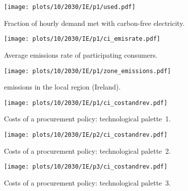 \begin{figure*}
    \centering
    \begin{subfigure}{0.5\textwidth}
        \centering
        \caption{Fraction of hourly demand met with carbon-free electricity.}
        \texttt{[image: plots/10/2030/IE/p1/used.pdf]}
        \label{fig:10-2030-IE-p1-used}
    \end{subfigure}%
    \begin{subfigure}{0.5\textwidth}
        \centering
        \caption{Average emissions rate of participating consumers.}
        \texttt{[image: plots/10/2030/IE/p1/ci\_emisrate.pdf]}
        \label{fig:10-2030-IE-p1-ci_emisrate}
    \end{subfigure}

    \begin{subfigure}{0.5\textwidth}
        \centering
        \caption{\co emissions in the local region (Ireland).}
        \texttt{[image: plots/10/2030/IE/p1/zone\_emissions.pdf]}
        \label{fig:10-2030-IE-p1-zone_emissions}
    \end{subfigure}%
    \begin{subfigure}{0.5\textwidth}
        \caption{Costs of a procurement policy: technological palette~1.}
        \texttt{[image: plots/10/2030/IE/p1/ci\_costandrev.pdf]}
        \label{fig:10-2030-IE-p1-ci_costandrev}
    \end{subfigure}%

    \begin{subfigure}{0.5\textwidth}
        \centering
        \caption{Costs of a procurement policy: technological palette~2.}
        \texttt{[image: plots/10/2030/IE/p2/ci\_costandrev.pdf]}
        \label{fig:10-2030-IE-p2-ci_costandrev}
    \end{subfigure}%
    \begin{subfigure}{0.5\textwidth}
        \centering
        \caption{Costs of a procurement policy: technological palette~3.}
        \texttt{[image: plots/10/2030/IE/p3/ci\_costandrev.pdf]}
        \label{fig:10-2030-IE-p3-ci_costandrev}
    \end{subfigure}

    \caption{Results for the case of Ireland 2030. 10\% participation rate. 
    Figures \ref{fig:10-2030-IE-p1-used}--\ref{fig:10-2030-IE-p1-ci_costandrev} display the technological palette~1 scenario.}
    \label{fig:10-2030-IE-6plots}
\end{figure*}



